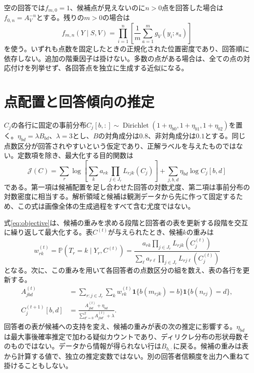 \documentclass[a4paper,11pt]{article}
\newcommand{\Prob}{\mathbb{P}}
\newcommand{\ind}{\mathbf{1}}
\DeclareMathOperator{\Dir}{Dirichlet}
\begin{document}
空の回答では$f_{m,0}=1$、候補点が見えないのに$n>0$点を回答した場合は$f_{0,n}=A_V^{-n}$とする。残りの$m>0$の場合は
\begin{equation}
 f_{m,n}(Y\mid S,V)=\prod_{i=1}^{n}
       \left[\frac1m\sum_{a=1}^{m}g_V(y_i;s_a)\right]
 \label{eq:remaining}
\end{equation}
を使う。いずれも点数を固定したときの正規化された位置密度であり、回答順に依存しない。追加の階乗因子は掛けない。多数の点がある場合は、全ての点の対応付けを列挙せず、各回答点を独立に生成する近似になる。

\section*{点配置と回答傾向の推定}

$C_j$の各行に固定の事前分布$C_j[b,:]\sim\Dir(1+\eta_{b0},1+\eta_{b1},1+\eta_{b2})$を置く。$\eta_{bd}=\lambda B_{bd}$、$\lambda=3$とし、$B$の対角成分は$0.8$、非対角成分は$0.1$とする。同じ点数区分が回答されやすいという仮定であり、正解ラベルを与えたものではない。定数項を除き、最大化する目的関数は
\begin{equation}
 \mathcal J(C)=\sum_r\log\!\left[
       \sum_k a_{rk}\prod_{j\in J_r}L_{rjk}(C_j)\right]
       +\sum_{j,b,d}\eta_{bd}\log C_j[b,d]
 \label{eq:objective}
\end{equation}
である。第一項は候補配置を足し合わせた回答の対数尤度、第二項は事前分布の対数密度に相当する。解析領域と候補は観測データから先に作って固定するため、この式は画像全体の生成過程をすべて含む尤度ではない。

式\eqref{eq:objective}は、候補の重みを求める段階と回答者の表を更新する段階を交互に繰り返して最大化する。表$C^{(t)}$が与えられたとき、候補$k$の重みは
\begin{equation}
 w_{rk}^{(t)}=\Prob(T_r=k\mid Y_r,C^{(t)})
 =\frac{a_{rk}\prod_{j\in J_r}L_{rjk}(C_j^{(t)})}
 {\sum_\ell a_{r\ell}\prod_{j\in J_r}L_{rj\ell}(C_j^{(t)})}
 \label{eq:posterior}
\end{equation}
となる。次に、この重みを用いて各回答者の点数区分の組を数え、表の各行を更新する。
\begin{align}
 A_{jbd}^{(t)}&=\sum_{r:j\in J_r}\sum_k w_{rk}^{(t)}
   \ind\{b(m_{rjk})=b\}\ind\{b(n_{rj})=d\},
 \label{eq:expected}\\
 C_j^{(t+1)}[b,d]&=
 \frac{A_{jbd}^{(t)}+\eta_{bd}}
 {\sum_{d'=0}^2 A_{jbd'}^{(t)}+\lambda}.
 \label{eq:update}
\end{align}
回答者の表が候補への支持を変え、候補の重みが表の次の推定に影響する。$\eta_{bd}$は最大事後確率推定で加わる疑似カウントであり、ディリクレ分布の形状母数そのものではない。データから情報が得られない行は$B_{b,:}$に戻る。候補の重みは表から計算する値で、独立の推定変数ではない。別の回答者信頼度を出力へ重ねて掛けることもしない。
\end{document}
